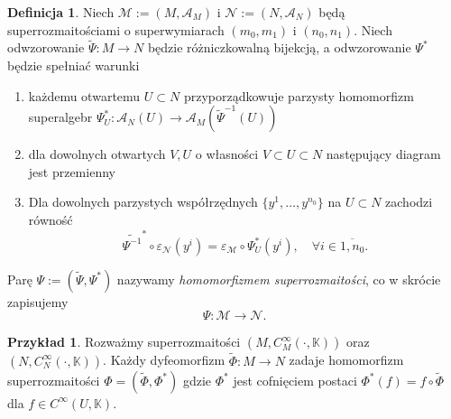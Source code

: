 \documentclass[11pt,a4paper]{report}
\theoremstyle{definition}
\newtheorem{example}[theorem]{Przykład}
\newtheorem{definition}[theorem]{Definicja}
\begin{document}
\begin{definition}
	\label{def:supermanifold_homomorphism}
	Niech $\mathcal{M} := (M, \mathcal{A}_M)$ i $\mathcal{N} := (N, \mathcal{A}_N)$ będą superrozmaitościami o superwymiarach $(m_0, m_1)$ i $(n_0, n_1)$. Niech odwzorowanie $\widetilde{\Psi}: M \rightarrow N$ będzie różniczkowalną bijekcją, a odwzorowanie $\Psi^*$ będzie spełniać warunki
	\begin{enumerate}[(1)]
		\item każdemu otwartemu $U \subset N$ przyporządkowuje parzysty homomorfizm superalgebr $\Psi^*_U : \mathcal{A}_N (U) \rightarrow \mathcal{A}_M ( \widetilde{\Psi}^{-1} (U) )$
		\item dla dowolnych otwartych $V, U$ o własności $V \subset U \subset N$ następujący diagram jest przemienny
		      \begin{center}
		      \end{center}
		\item Dla dowolnych parzystych współrzędnych $\{ y^1, \ldots, y^{n_0} \}$ na $U \subset N$ zachodzi równość
		      \begin{equation}
		      	\label{eq:psi_psistar}
		      	\widetilde{\Psi^{-1}}^* \circ \varepsilon_\mathcal{N} (y^i) = \varepsilon_\mathcal{M} \circ \Psi_U ^* (y^i), \quad \forall i \in \overline{1, n_0}.
		      \end{equation}
	\end{enumerate}
	Parę $\Psi := ( \widetilde{\Psi}, \Psi^* )$ nazywamy \textit{homomorfizmem superrozmaitości}, co w skrócie zapisujemy $$\Psi: \mathcal{M} \rightarrow \mathcal{N}.$$
\end{definition} 
		      			
\begin{example}
	Rozważmy superrozmaitości $(M, C^\infty_M(\cdot, \mathbb{K}))$ oraz $(N, C^\infty_N(\cdot, \mathbb{K}))$. Każdy dyfeomorfizm $\widetilde{\Phi}: M \rightarrow N$ zadaje homomorfizm superrozmaitości $\Phi = (\widetilde{\Phi}, \Phi^*)$ gdzie $\Phi^*$ jest cofnięciem postaci $\Phi^*(f) = f \circ \widetilde{\Phi}$ dla $f \in C^\infty(U, \mathbb{K})$.
\end{example}
		      			
\end{document}
